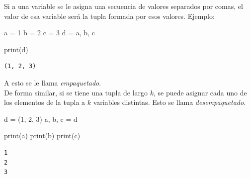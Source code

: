 \documentclass[
  letterpaper,
  DIV=11,
  numbers=noendperiod]{scrreprt}
\newenvironment{Shaded}{\begin{snugshade}}{\end{snugshade}}
\newcommand{\BuiltInTok}[1]{\textcolor[rgb]{0.00,0.23,0.31}{#1}}
\newcommand{\DecValTok}[1]{\textcolor[rgb]{0.68,0.00,0.00}{#1}}
\newcommand{\NormalTok}[1]{\textcolor[rgb]{0.00,0.23,0.31}{#1}}
\newcommand{\OperatorTok}[1]{\textcolor[rgb]{0.37,0.37,0.37}{#1}}
\begin{document}
Si a una variable se le asigna una secuencia de valores separados por
comas, el valor de esa variable será la tupla formada por esos valores.
Ejemplo:

\begin{Shaded}
\begin{Highlighting}[]
\NormalTok{a }\OperatorTok{=} \DecValTok{1}
\NormalTok{b }\OperatorTok{=} \DecValTok{2}
\NormalTok{c }\OperatorTok{=} \DecValTok{3}
\NormalTok{d }\OperatorTok{=}\NormalTok{ a, b, c}

\BuiltInTok{print}\NormalTok{(d)}
\end{Highlighting}
\end{Shaded}

\begin{verbatim}
(1, 2, 3)
\end{verbatim}

A esto se le llama \emph{empaquetado}.\\

De forma similar, si se tiene una tupla de largo \(k\), se puede asignar
cada uno de los elementos de la tupla a \(k\) variables distintas. Esto
se llama \emph{desempaquetado}.

\begin{Shaded}
\begin{Highlighting}[]
\NormalTok{d }\OperatorTok{=}\NormalTok{ (}\DecValTok{1}\NormalTok{, }\DecValTok{2}\NormalTok{, }\DecValTok{3}\NormalTok{)}
\NormalTok{a, b, c }\OperatorTok{=}\NormalTok{ d}

\BuiltInTok{print}\NormalTok{(a)}
\BuiltInTok{print}\NormalTok{(b)}
\BuiltInTok{print}\NormalTok{(c)}
\end{Highlighting}
\end{Shaded}

\begin{verbatim}
1
2
3
\end{verbatim}
\end{document}
